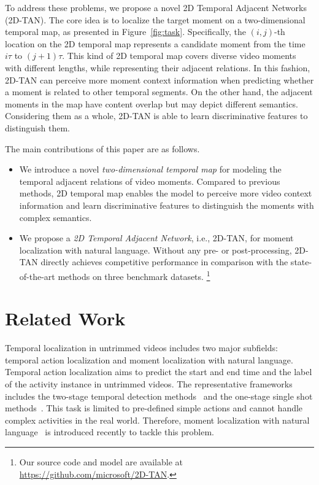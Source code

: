 \documentclass[letterpaper]{article} %
\begin{document}
To address these problems, we propose a novel 2D Temporal Adjacent Networks (2D-TAN). The core idea is to localize the target moment on a two-dimensional temporal map, as presented in Figure~\ref{fig:task}.
Specifically, the $(i,j)$-th location on the 2D temporal map represents a candidate moment  from the time $i\tau$ to $(j+1)\tau$. 
This kind of 2D temporal map covers diverse video moments with different lengths, while representing their adjacent relations. 
In this fashion, 2D-TAN can perceive more moment context information when predicting whether a moment is related to other temporal segments. 
On the other hand, the adjacent moments in the map have content overlap but may depict different semantics. Considering them as a whole, 2D-TAN is able to learn discriminative features to distinguish them.

The main contributions of this paper are as follows.
\begin{itemize}[leftmargin=0.38cm]

\item{We introduce a novel \textit{two-dimensional temporal map} for modeling the temporal adjacent relations of video moments. Compared to previous methods, 2D temporal map enables the model to perceive more video context information and learn discriminative features to distinguish the moments with complex semantics.
}

\item{We propose a \emph{2D Temporal Adjacent Network}, i.e., 2D-TAN, for moment localization with natural language. 
Without any pre- or post-processing, 2D-TAN directly achieves competitive performance in comparison with the state-of-the-art methods on three benchmark datasets. 
\footnote{Our source code and model are available at \url{https://github.com/microsoft/2D-TAN}.}
}
\end{itemize}

\section{Related Work}

Temporal localization in untrimmed videos includes two major subfields: temporal action localization and moment localization with natural language. Temporal action localization aims to predict the start and end time and the label of the activity instance in untrimmed videos. The representative frameworks includes the two-stage temporal detection methods~\cite{SSN2017ICCV} and the one-stage single shot methods~\cite{lin2017single}. 
This task is limited to pre-defined simple actions and cannot handle complex activities in the real world. Therefore, moment localization with natural language~\cite{gao2017tall,hendricks17iccv} is introduced recently to tackle this problem.
\end{document}
